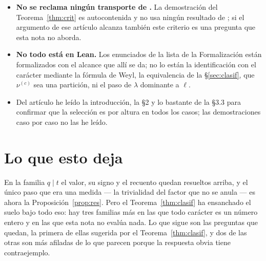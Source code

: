 \documentclass[11pt,a4paper]{article}
\newcommand{\SO}{\mathrm{SO}}
\begin{document}
\begin{itemize}
Caracteres puedo calcularlos en $C_m$ y en $G_2$, pero no en tipo $B$, donde haría falta el de
$\SO(2m+1)$.
\item \textbf{No se reclama ningún transporte de \cite{Prasad16}.} La demostración del
Teorema~\ref{thm:crit} es autocontenida y no usa ningún resultado de \cite{Prasad16}; si el argumento
de ese artículo alcanza también este criterio es una pregunta que esta nota no aborda.
\item \textbf{No todo está en Lean.} Los enunciados de la lista de la Formalización están formalizados
con el alcance que allí se da; no lo están la identificación con el carácter mediante la fórmula de
Weyl, la equivalencia de la \S\ref{sec:clasif}, que $\nu^{(c)}$ sea una partición, ni el paso de
$\lambda$ dominante a $\ell$.
\item Del artículo \cite{Polo25} he leído la introducción, la \S2 y lo bastante de la \S3.3 para confirmar
que la selección es por altura en todos los casos; las demostraciones caso por caso no las he leído.
\end{itemize}


\section{Lo que esto deja}\label{sec:preguntas}

En la familia $q\mid t$ el valor, su signo y el recuento quedan resueltos arriba, y el único paso
que era una medida --- la trivialidad del factor que no se anula --- es ahora la
Proposición~\ref{prop:res}. Pero el Teorema~\ref{thm:clasif} ha ensanchado el suelo bajo todo
eso: hay tres familias más en las que todo carácter es un número entero y en las que esta nota no
evalúa nada. Lo que sigue son las preguntas que quedan, la primera de ellas sugerida
por el Teorema~\ref{thm:clasif}, y dos de las otras son más afiladas de lo que parecen porque la
respuesta obvia tiene contraejemplo.
\end{document}
